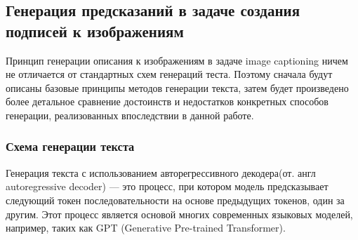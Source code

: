 \documentclass[a4paper,12pt]{extarticle}
\begin{document}
\subsection{Генерация предсказаний в задаче создания подписей к изображениям}

Принцип генерации описания к изображениям в задаче image captioning ничем не отличается от стандартных схем генераций теста. Поэтому сначала будут описаны базовые принципы методов генерации текста, затем будет произведено более детальное сравнение достоинств и недостатков конкретных способов генерации, реализованных впоследствии в данной работе.

\subsubsection{Схема генерации текста}\label{schema-gen-text}

Генерация текста с использованием авторегрессивного декодера(от. англ autoregressive decoder) — это процесс, при котором модель предсказывает следующий токен последовательности на основе предыдущих токенов, один за другим. Этот процесс является основой многих современных языковых моделей, например, таких как GPT (Generative Pre-trained Transformer).
\end{document}
